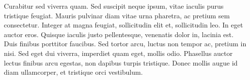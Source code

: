 \documentclass{article}
\begin{document}
Curabitur sed viverra quam. Sed suscipit neque ipsum, vitae iaculis purus
tristique feugiat. Mauris pulvinar diam vitae urna pharetra, ac pretium sem
consectetur. Integer at magna feugiat, sollicitudin elit et, sollicitudin leo.
In eget auctor eros. Quisque iaculis justo pellentesque, venenatis dolor in,
lacinia est. Duis finibus porttitor faucibus. Sed tortor arcu, luctus non tempor
ac, pretium in nisi. Sed eget dui viverra, imperdiet quam eget, mollis odio.
Phasellus auctor lectus finibus arcu egestas, non dapibus turpis tristique.
Donec mollis augue id diam ullamcorper, et tristique orci vestibulum.
\end{document}
